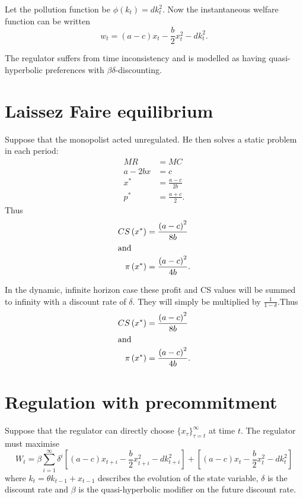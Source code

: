 \documentclass{amsart}
\begin{document}
Let the pollution function be $\phi(k_t) = dk_t^2$. Now the
instantaneous welfare function can be written
\begin{equation}
  \label{eq:10} w_t = (a-c)x_t - \frac{b}{2}x_t^2 - dk_t^2.
\end{equation}

The regulator suffers from time inconsistency and is modelled as
having quasi-hyperbolic preferences with $\beta\delta$-discounting.

\section{Laissez Faire equilibrium}
\label{sec:laiss-faire-equil}

Suppose that the monopolist acted unregulated. He then solves a static
problem in each period:
\begin{align}
  \label{eq:8} MR &= MC \\ a-2bx &= c \\ x^* &= \frac{a-c}{2b} \\ p^*
  &= \frac{a+c}{2}.
\end{align} Thus
\begin{align}
  \label{eq:9} CS\left( x^*\right) &= \frac{\left( a-c \right)^2}{8b}
\\ \intertext{and} \pi\left( x^*\right) &= \frac{\left( a-c
\right)^2}{4b}.
\end{align}

In the dynamic, infinite horizon case these profit and CS values will
be summed to infinity with a discount rate of $\delta$. They will
simply be multiplied by $\frac{1}{1-\delta}$.Thus
\begin{align}
  \label{eq:9} CS\left( x^*\right) &= \frac{\left( a-c \right)^2}{8b}
\\ \intertext{and} \pi\left( x^*\right) &= \frac{\left( a-c
\right)^2}{4b}.
\end{align}


\section{Regulation with precommitment}
\label{sec:regul-with-prec}

Suppose that the regulator can directly choose $\{ x_\tau
\}_{\tau=t}^\infty$ at time $t$. The regulator must maximise
\begin{equation}
  \label{eq:11} W_t = \beta \sum_{i=1}^\infty \delta^i \left[
(a-c)x_{t+i} - \frac{b}{2}x_{t+i}^2 - dk_{t+i}^2 \right] + \left[
(a-c)x_t - \frac{b}{2}x_t^2 - dk_t^2 \right]
\end{equation} where $k_t = \theta k_{t-1} + x_{t-1}$ describes the
evolution of the state variable, $\delta$ is the discount rate and
$\beta$ is the quasi-hyperbolic modifier on the future discount rate.
\end{document}
